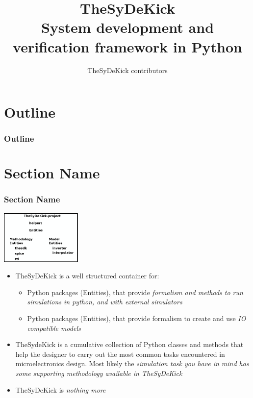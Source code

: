 \documentclass{sdkslides}
\title{\Huge{TheSyDeKick}\\ \vspace{0.2in} \normalsize{System development and
verification framework in Python}}
\institute[ELE]{TheSyDeKick Community}
\author{TheSyDeKick contributors}
\date{\lectdate}
\newcommand{\sectname}{Section Name}
\begin{document}
\sdktitleframe

\section*{Outline}
\begin{frame}[c]
    \frametitle{Outline}
    \tableofcontents
\end{frame}



\renewcommand{\sectname}{What is it?}
\section{\sectname}
\begin{frame}[t]
    \frametitle{\sectname}
    \centering
        \includegraphics[width=0.3\textwidth]{Pics/TheSyDeKick-entity-principles.eps}
        \begin{itemize}
            \item TheSyDeKick is a well structured container for: 
                \begin{itemize}
                    \item Python packages (Entities), that provide
                        \emph{formalism and methods to run simulations in
                        python, and with external simulators}
                    \item Python packages (Entities), that provide
                        formalism to create and use \emph{IO compatible models}
                \end{itemize}
            \item TheSydeKick is a cumulative collection of Python classes and
                methods that help the designer to carry out the most common
                tasks encountered in microelectronics design. Most likely the
                \emph{simulation task you have in mind has some supporting
                    methodology available in TheSyDeKick}
            \item TheSyDeKick is \emph{nothing more}
        \end{itemize}
\end{frame}
\end{document}
